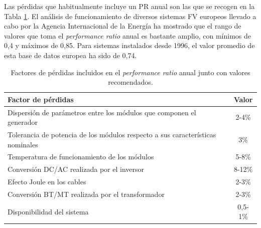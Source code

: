 Las pérdidas que habitualmente incluye un PR anual son las que se
recogen en la Tabla \ref{tab:PR}. El análisis de funcionamiento de diversos sistemas FV europeos llevado
a cabo por la Agencia Internacional de la Energía
\citep{Clavadetscher.Nordmann2007} ha mostrado que el rango de valores
que toma el \emph{performance ratio} anual es bastante amplio, con mínimos
de 0,4 y máximos de 0,85. Para sistemas instalados desde 1996, el
valor promedio de esta base de datos europea ha sido de 0,74.
%
\begin{table}
  \caption{Factores de pérdidas incluidos en el \emph{performance
      ratio} anual junto
    con valores recomendados.\label{tab:PR}}

\begin{tabular}{>{\centering}p{8cm}c}
  \toprule 
  Factor de pérdidas & Valor\tabularnewline
  \midrule
  \midrule 
  Dispersión de parámetros entre los módulos que componen el generador  & 2-4\%\tabularnewline
  \midrule 
  Tolerancia de potencia de los módulos respecto a sus características
  nominales  & 3\%\tabularnewline
  \midrule 
  Temperatura de funcionamiento de los módulos  & 5-8\%\tabularnewline
  \midrule 
  Conversión DC/AC realizada por el inversor & 8-12\%\tabularnewline
  \midrule 
  Efecto Joule en los cables  & 2-3\%\tabularnewline
  \midrule 
  Conversión BT/MT realizada por el transformador & 2-3\%\tabularnewline
  \midrule 
  Disponibilidad del sistema  & 0,5-1\%\tabularnewline
  \bottomrule
\end{tabular}
\end{table}





